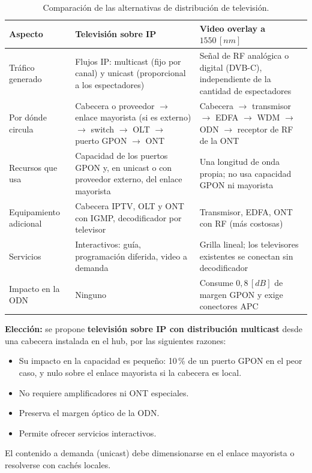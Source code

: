 \begin{table}[H]
    \centering
    \footnotesize
    \caption{Comparación de las alternativas de distribución de televisión.}
    \label{tab:tv_comparacion}
    \begin{tabular}{|p{3.0cm}|p{5.6cm}|p{5.6cm}|}
        \hline
        \textbf{Aspecto} & \textbf{Televisión sobre IP} & \textbf{Video overlay a $1550 \, [nm]$} \\
        \hline
        Tráfico generado & Flujos IP: multicast (fijo por canal) y unicast (proporcional a los espectadores) & Señal de RF analógica o digital (DVB-C), independiente de la cantidad de espectadores \\
        \hline
        Por dónde circula & Cabecera o proveedor $\rightarrow$ enlace mayorista (si es externo) $\rightarrow$ switch $\rightarrow$ OLT $\rightarrow$ puerto GPON $\rightarrow$ ONT & Cabecera $\rightarrow$ transmisor $\rightarrow$ EDFA $\rightarrow$ WDM $\rightarrow$ ODN $\rightarrow$ receptor de RF de la ONT \\
        \hline
        Recursos que usa & Capacidad de los puertos GPON y, en unicast o con proveedor externo, del enlace mayorista & Una longitud de onda propia; no usa capacidad GPON ni mayorista \\
        \hline
        Equipamiento adicional & Cabecera IPTV, OLT y ONT con IGMP, decodificador por televisor & Transmisor, EDFA, ONT con RF (más costosas) \\
        \hline
        Servicios & Interactivos: guía, programación diferida, video a demanda & Grilla lineal; los televisores existentes se conectan sin decodificador \\
        \hline
        Impacto en la ODN & Ninguno & Consume $0{,}8 \, [dB]$ de margen GPON y exige conectores APC \\
        \hline
    \end{tabular}
\end{table}

\textbf{Elección:} se propone \textbf{televisión sobre IP con distribución multicast} desde una cabecera instalada en el hub, por las siguientes razones:
\begin{itemize}
    \item Su impacto en la capacidad es pequeño: 10\,\% de un puerto GPON en el peor caso, y nulo sobre el enlace mayorista si la cabecera es local.
    \item No requiere amplificadores ni ONT especiales.
    \item Preserva el margen óptico de la ODN.
    \item Permite ofrecer servicios interactivos.
\end{itemize}
El contenido a demanda (unicast) debe dimensionarse en el enlace mayorista o resolverse con cachés locales.

